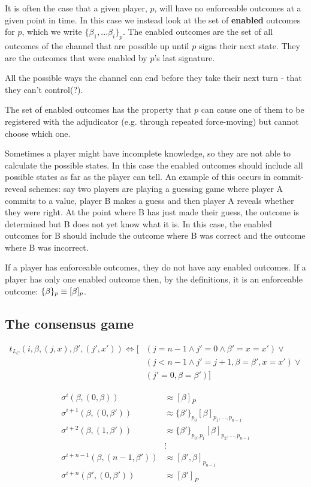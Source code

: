 It is often the case that a given player, $p$, will have no enforceable outcomes at a given point in time. In this case we instead look at the set of \textbf{enabled} outcomes for $p$, which we write $\{\beta_1, ... \beta_i\}_p$. The enabled outcomes are the set of all outcomes of the channel that are possible up until $p$ signs their next state. They are the outcomes that were enabled by $p$'s last signature.

All the possible ways the channel can end before they take their next turn - that they can't control(?).

The set of enabled outcomes has the property that $p$ can cause one of them to be registered with the adjudicator (e.g. through repeated force-moving) but cannot choose which one.

Sometimes a player might have incomplete knowledge, so they are not able to calculate the possible states. In this case the enabled outcomes should include all possible states as far as the player can tell. An example of this occurs in commit-reveal schemes: say two players are playing a guessing game where player A commits to a value, player B makes a guess and then player A reveals whether they were right. At the point where B has just made their guess, the outcome is determined but B does not yet know what it is. In this case, the enabled outcomes for B should include the outcome where B was correct and the outcome where B was incorrect.

If a player has enforceable outcomes, they do not have any enabled outcomes.
If a player has only one enabled outcome then, by the definitions, it is an enforceable outcome: $\{\beta \}_p \equiv [\beta]_p$. 


\subsection{The consensus game}

  \begin{align*}
    t_{L_C}(i, \beta, (j, x), \beta', (j', x')) \Leftrightarrow
      [ & (j=n-1 \wedge j'= 0 \wedge \beta' = x = x')  \vee \\
      & (j < n-1 \wedge j' = j+1, \beta = \beta', x = x') \vee \\
      & (j'=0, \beta = \beta') ]
  \end{align*}

  \begin{align*}
    \sigma^{i}(\beta, (0, \beta)) & \approx [\beta]_P \\
    \sigma^{i+1}(\beta, (0, \beta')) & \approx \{\beta'\}_{p_0}[\beta]_{p_1, ..., p_{n-1}} \\
    \sigma^{i+2}(\beta, (1, \beta')) & \approx \{\beta'\}_{p_0, p_1}[\beta]_{p_2, ..., p_{n-1}} \\
    &\vdots\\
    \sigma^{i+n-1}(\beta, (n-1, \beta')) & \approx [\beta', \beta]_{p_{n-1}} \\
    \sigma^{i+n}(\beta', (0, \beta')) & \approx [\beta']_{P} \\
  \end{align*}

